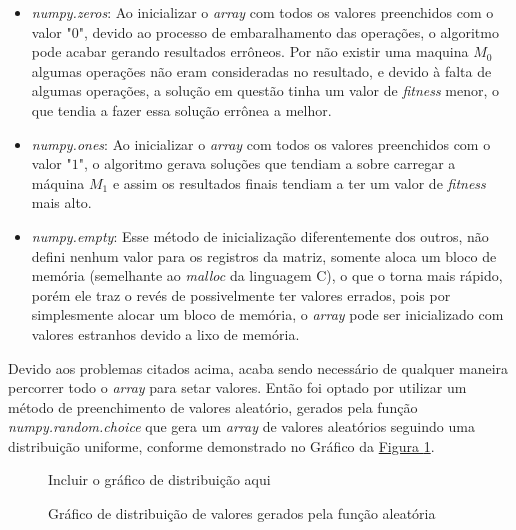 \begin{itemize}
    \item \textit{numpy.zeros}: Ao inicializar o \textit{array} com todos os valores preenchidos com o valor "$0$", devido ao processo de embaralhamento das operações, o algoritmo pode acabar gerando resultados errôneos. Por não existir uma maquina $M_0$ algumas operações não eram consideradas no resultado, e devido à falta de algumas operações, a solução em questão tinha um valor de \textit{fitness} menor, o que tendia a fazer essa solução errônea a melhor.

    \item \textit{numpy.ones}: Ao inicializar o \textit{array} com todos os valores preenchidos com o valor "$1$", o algoritmo gerava soluções que tendiam a sobre carregar a máquina $M_1$ e assim os resultados finais tendiam a ter um valor de \textit{fitness} mais alto.

    \item \textit{numpy.empty}: Esse método de inicialização diferentemente dos outros, não defini nenhum valor para os registros da matriz, somente aloca um bloco de memória (semelhante ao \textit{malloc} da linguagem C), o que o torna mais rápido, porém ele traz o revés de possivelmente ter valores errados, pois por simplesmente alocar um bloco de memória, o \textit{array} pode ser inicializado com valores estranhos devido a lixo de memória.
\end{itemize}

\noindent Devido aos problemas citados acima, acaba sendo necessário de qualquer maneira percorrer todo o \textit{array} para setar valores. \newline 
Então foi optado por utilizar um método de preenchimento de valores aleatório, 
gerados pela função \textit{numpy.random.choice} que gera um \textit{array} de valores aleatórios seguindo uma distribuição uniforme, 
conforme demonstrado no Gráfico da \hyperref[fig:distrib-uniforme]{Figura \ref{fig:distrib-uniforme}}.

\begin{figure}[ht]
    \centering
    \small{Incluir o gráfico de distribuição aqui}
    \caption{Gráfico de distribuição de valores gerados pela função aleatória}
    \label{fig:distrib-uniforme}
\end{figure}

%

